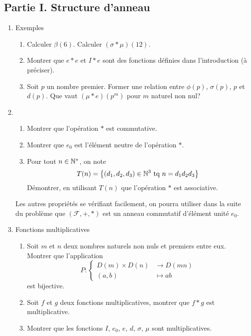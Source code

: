 \subsection*{Partie I. Structure d'anneau}
\begin{enumerate}
 \item Exemples
\begin{enumerate}
 \item Calculer $\beta(6)$. Calculer $(\sigma * \mu )(12)$.
 \item Montrer que $e*e$ et $I*e$ sont des fonctions définies dans l'introduction (à préciser).
 \item Soit $p$ un nombre premier. Former une relation entre $\phi(p)$, $\sigma(p)$, $p$ et $d(p)$. Que vaut $(\mu * e)(p^m)$ pour $m$ naturel non nul?
\end{enumerate}

 \item
\begin{enumerate}
 \item Montrer que l'opération $*$ est commutative.
 \item Montrer que $e_0$ est l'élément neutre de l'opération $*$.
 \item Pour tout $n\in \mathbb{N}^*$, on  note
\begin{displaymath}
 T(n) = \left\lbrace (d_1,d_2,d_3)\in \mathbb{N}^3 \text{ tq } n = d_1d_2d_3\right\rbrace 
\end{displaymath}
Démontrer, en utilisant $T(n)$ que l'opération $*$ est associative.
\end{enumerate}
Les autres propriétés se vérifiant facilement, on pourra utiliser dans la suite du problème que $(\mathcal{F},+,*)$ est un anneau commutatif d'élément unité $e_0$.

\item Fonctions multiplicatives
\begin{enumerate}
 \item Soit $m$ et $n$ deux nombres naturels non nuls et premiers entre eux. Montrer que l'application
\begin{displaymath}
 P:
\left\lbrace 
\begin{aligned}
 D(m)\times D(n) &\rightarrow D(mn)\\ (a,b) &\mapsto ab
\end{aligned}
\right. 
\end{displaymath}
est bijective. 
\item Soit $f$ et $g$ deux fonctions multiplicatives, montrer que $f*g$ est multiplicative.
\item Montrer que les fonctions $I$, $e_0$, $e$, $d$, $\sigma$, $\mu$ sont multiplicatives.
\end{enumerate}


\end{enumerate}
